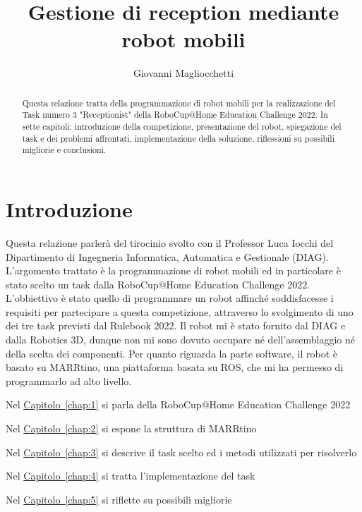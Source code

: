 \documentclass[italian, twoside]{sapthesis} %
\title{Gestione di reception mediante robot mobili}
\author{Giovanni Magliocchetti}
\begin{document}
\frontmatter
\maketitle

\begin{abstract}
Questa relazione tratta della programmazione di robot mobili per la realizzazione del Task numero 3 "Receptionist" della RoboCup@Home Education Challenge 2022. In sette capitoli: introduzione della competizione, presentazione del robot, spiegazione del task e dei problemi affrontati, implementazione della soluzione, riflessioni su possibili migliorie e conclusioni.
\end{abstract}

\tableofcontents

\mainmatter
\chapter{Introduzione}
\lettrine[lines=2, findent=3pt, nindent=0pt]{Q}{}uesta relazione parlerà del tirocinio svolto con il Professor Luca Iocchi del Dipartimento di Ingegneria Informatica, Automatica e Gestionale (DIAG). L'argomento trattato è la programmazione di robot mobili ed in particolare è stato scelto un task dalla RoboCup@Home Education Challenge 2022. L'obbiettivo è stato quello di programmare un robot affinché soddisfacesse i requisiti per partecipare a questa competizione, attraverso lo svolgimento di uno dei tre task previsti dal Rulebook 2022. Il robot mi è stato fornito dal DIAG e dalla Robotics 3D, dunque non mi sono dovuto occupare né dell'assemblaggio né della scelta dei componenti. Per quanto riguarda la parte software, il robot è basato su MARRtino, una piattaforma basata su ROS, che mi ha permesso di programmarlo ad alto livello.

\bigskip
Nel \hyperref[chap:1]{Capitolo~\ref*{chap:1}} si parla della RoboCup@Home Education Challenge 2022

\bigskip
Nel \hyperref[chap:2]{Capitolo~\ref*{chap:2}} si espone la struttura di MARRtino

\bigskip
Nel \hyperref[chap:2]{Capitolo~\ref*{chap:3}} si descrive il task scelto ed i metodi utilizzati per risolverlo

\bigskip
Nel \hyperref[chap:4]{Capitolo~\ref*{chap:4}} si tratta l'implementazione del task

\bigskip
Nel \hyperref[chap:5]{Capitolo~\ref*{chap:5}} si riflette su possibili migliorie
\end{document}

